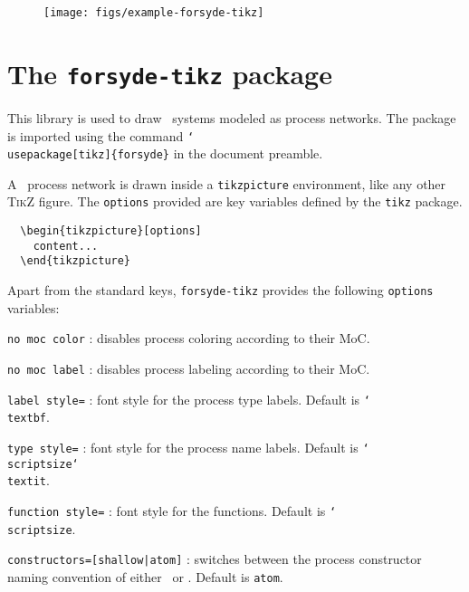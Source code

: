 \begin{figure}[htb]\centering
\texttt{[image: figs/example-forsyde-tikz]}
\end{figure}


\section{The \texttt{forsyde-tikz} package}


This library is used to draw \ForSyDe\ systems modeled as process networks. The package is imported using the command \texttt{\char`\\usepackage[tikz]\{forsyde\}} in the document preamble.

A \ForSyDe\ process network is drawn inside a \texttt{tikzpicture} environment, like any other \textsc{TikZ} figure. The \texttt{options} provided are key variables defined by the \texttt{tikz} package. 

\begin{verbatim}
  \begin{tikzpicture}[options]
    content...
  \end{tikzpicture}
\end{verbatim}

Apart from the standard keys, \texttt{forsyde-tikz} provides the following \texttt{options} variables:
\begin{optionslist}
\item \texttt{no moc color} : disables process coloring according to their MoC.
\item \texttt{no moc label} : disables process labeling according to their MoC.
\item \texttt{label style=} : font style for the process type labels. Default is \texttt{\char`\\ textbf}.
\item \texttt{type style=} : font style for the process name labels. Default is \texttt{\char`\\ scriptsize\char`\\textit}.
\item \texttt{function style=} : font style for the functions. Default is \texttt{\char`\\ scriptsize}.
\item \texttt{constructors=[shallow|atom]} : switches between the process constructor naming convention of either \ForSyDeShallow\ or \ForSyDeAtom. Default is \texttt{atom}.
\end{optionslist}

